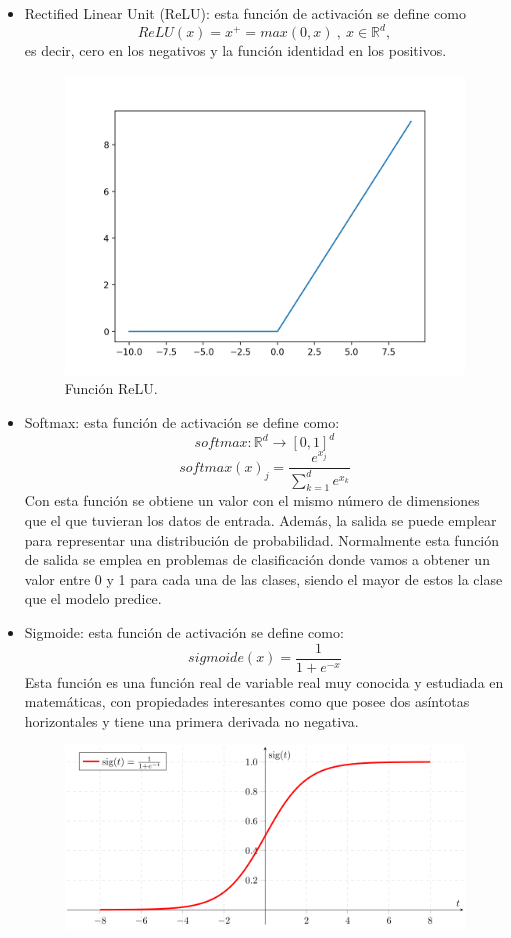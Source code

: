 \begin{itemize}
	\item Rectified Linear Unit (ReLU): esta función de activación se define como 
	$$ReLU(x) = x^+ = max(0,x) \ , \ x\in \mathbb{R}^d,$$
	es decir, cero en los negativos y la función identidad en los positivos.
	\begin{figure}[H]
		\centering
		\includegraphics[scale=0.5]{imagenes/relu.png}
		\caption{Función ReLU.}
		\label{img:relu}
	\end{figure}
	\item Softmax: esta función de activación se define como:
	$$softmax : \mathbb{R}^d \rightarrow [0,1]^d$$
	$$softmax(x)_j = \frac{e^{x_j}}{\sum_{k=1}^{d}e^{x_k}}$$
	Con esta función se obtiene un valor con el mismo número de dimensiones que el que tuvieran los datos de entrada. Además, la salida se puede emplear para representar una distribución de probabilidad. Normalmente esta función de salida se emplea en problemas de clasificación donde vamos a obtener un valor entre 0 y 1 para cada una de las clases, siendo el mayor de estos la clase que el modelo predice.
	\item Sigmoide: esta función de activación se define como:
	$$sigmoide(x) = \frac{1}{1+e^{-x}}$$
	Esta función es una función real de variable real muy conocida y estudiada en matemáticas, con propiedades interesantes como que posee dos asíntotas horizontales y tiene una primera derivada no negativa.
	\begin{figure}[H]
		\centering
		\includegraphics[scale=0.5]{imagenes/sigmoide.png}

\end{figure}
\end{itemize}
